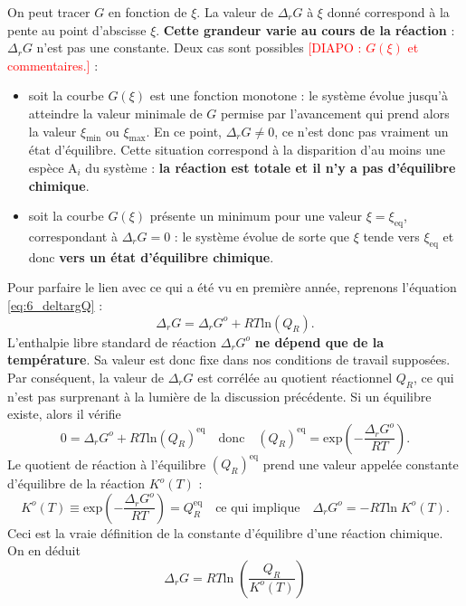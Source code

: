 \documentclass[11pt,a4paper]{report}
\begin{document}
On peut tracer $G$ en fonction de $\xi$. La valeur de $\Delta_r G$ à $\xi$ donné correspond à la pente au point d'abscisse $\xi$. \textbf{Cette grandeur varie au cours de la réaction} : $\Delta_r G$ n'est pas une constante. Deux cas sont possibles \textcolor{red}{[DIAPO : $G(\xi)$ et commentaires.]} :
\begin{itemize}
	\item soit la courbe $G(\xi)$ est une fonction monotone : le système évolue jusqu'à atteindre la valeur minimale de $G$ permise par l'avancement qui prend alors la valeur $\xi_\text{min}$ ou $\xi_\text{max}$. En ce point, $\Delta_r G \neq 0$, ce n'est donc pas vraiment un état d'équilibre. Cette situation correspond à la disparition d'au moins une espèce $\text{A}_i$ du système : \textbf{la réaction est totale et il n'y a pas d'équilibre chimique}.
	\item soit la courbe $G(\xi)$ présente un minimum pour une valeur $\xi = \xi_\text{eq}$, correspondant à $\Delta_r G = 0$ : le système évolue de sorte que $\xi$ tende vers $\xi_\text{eq}$ et donc \textbf{vers un état d'équilibre chimique}.\\ 
\end{itemize}

Pour parfaire le lien avec ce qui a été vu en première année, reprenons l'équation \eqref{eq:6_deltargQ} :
\begin{equation}
	\Delta_r G = \Delta_r G^o + RT \text{ln}(Q_R).
\end{equation}
L'enthalpie libre standard de réaction $\Delta_r G^o$ \textbf{ne dépend que de la température}. Sa valeur est donc fixe dans nos conditions de travail supposées. Par conséquent, la valeur de $\Delta_r G$ est corrélée au quotient réactionnel $Q_R$, ce qui n'est pas surprenant à la lumière de la discussion précédente. Si un équilibre existe, alors il vérifie
\begin{equation}
	0 = \Delta_r G^o + RT \text{ln}(Q_R)^\text{eq} \quad\text{donc}\quad (Q_R)^\text{eq} = \text{exp}\left(-\frac{\Delta_r G^o}{RT}\right).
\end{equation}
Le quotient de réaction à l'équilibre $(Q_R)^\text{eq}$ prend une valeur appelée constante d'équilibre de la réaction $K^o(T)$ :
\begin{equation}
	\boxed{K^o(T) \equiv \text{exp}\left(-\frac{\Delta_r G^o}{RT}\right) = Q_R^\text{eq} \quad\text{ce qui implique}\quad \Delta_r G^o = - RT \text{ln}\;K^o(T)}.
\end{equation}
Ceci est la vraie définition de la constante d'équilibre d'une réaction chimique. On en déduit
\begin{equation}
	\Delta_r G = RT\text{ln}\;\left(\frac{Q_R}{K^o(T)}\right)
\end{equation}
\end{document}
